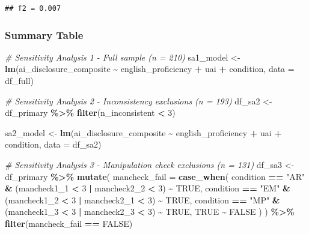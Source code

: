 \documentclass[
]{article}
\newenvironment{Shaded}{\begin{snugshade}}{\end{snugshade}}
\newcommand{\AttributeTok}[1]{\textcolor[rgb]{0.13,0.29,0.53}{#1}}
\newcommand{\CommentTok}[1]{\textcolor[rgb]{0.56,0.35,0.01}{\textit{#1}}}
\newcommand{\ConstantTok}[1]{\textcolor[rgb]{0.56,0.35,0.01}{#1}}
\newcommand{\DecValTok}[1]{\textcolor[rgb]{0.00,0.00,0.81}{#1}}
\newcommand{\FunctionTok}[1]{\textcolor[rgb]{0.13,0.29,0.53}{\textbf{#1}}}
\newcommand{\NormalTok}[1]{#1}
\newcommand{\OtherTok}[1]{\textcolor[rgb]{0.56,0.35,0.01}{#1}}
\newcommand{\SpecialCharTok}[1]{\textcolor[rgb]{0.81,0.36,0.00}{\textbf{#1}}}
\newcommand{\StringTok}[1]{\textcolor[rgb]{0.31,0.60,0.02}{#1}}
\begin{document}
\begin{verbatim}
## f2 = 0.007
\end{verbatim}

\subsubsection{Summary Table}\label{summary-table}

\begin{Shaded}
\begin{Highlighting}[]
\CommentTok{\# Sensitivity Analysis 1 {-} Full sample (n = 210)}
\NormalTok{sa1\_model }\OtherTok{\textless{}{-}} \FunctionTok{lm}\NormalTok{(ai\_disclosure\_composite }\SpecialCharTok{\textasciitilde{}}\NormalTok{ english\_proficiency }\SpecialCharTok{+}\NormalTok{ uai }\SpecialCharTok{+}\NormalTok{ condition,}
                \AttributeTok{data =}\NormalTok{ df\_full)}

\CommentTok{\# Sensitivity Analysis 2 {-} Inconsistency exclusions (n = 193)}
\NormalTok{df\_sa2 }\OtherTok{\textless{}{-}}\NormalTok{ df\_primary }\SpecialCharTok{\%\textgreater{}\%}
  \FunctionTok{filter}\NormalTok{(n\_inconsistent }\SpecialCharTok{\textless{}} \DecValTok{3}\NormalTok{)}

\NormalTok{sa2\_model }\OtherTok{\textless{}{-}} \FunctionTok{lm}\NormalTok{(ai\_disclosure\_composite }\SpecialCharTok{\textasciitilde{}}\NormalTok{ english\_proficiency }\SpecialCharTok{+}\NormalTok{ uai }\SpecialCharTok{+}\NormalTok{ condition,}
                \AttributeTok{data =}\NormalTok{ df\_sa2)}

\CommentTok{\# Sensitivity Analysis 3 {-} Manipulation check exclusions (n = 131)}
\NormalTok{df\_sa3 }\OtherTok{\textless{}{-}}\NormalTok{ df\_primary }\SpecialCharTok{\%\textgreater{}\%}
  \FunctionTok{mutate}\NormalTok{(}
    \AttributeTok{mancheck\_fail =} \FunctionTok{case\_when}\NormalTok{(}
\NormalTok{      condition }\SpecialCharTok{==} \StringTok{"AR"} \SpecialCharTok{\&}\NormalTok{ (mancheck1\_1 }\SpecialCharTok{\textless{}} \DecValTok{3} \SpecialCharTok{|}\NormalTok{ mancheck2\_2 }\SpecialCharTok{\textless{}} \DecValTok{3}\NormalTok{) }\SpecialCharTok{\textasciitilde{}} \ConstantTok{TRUE}\NormalTok{,}
\NormalTok{      condition }\SpecialCharTok{==} \StringTok{"EM"} \SpecialCharTok{\&}\NormalTok{ (mancheck1\_2 }\SpecialCharTok{\textless{}} \DecValTok{3} \SpecialCharTok{|}\NormalTok{ mancheck2\_1 }\SpecialCharTok{\textless{}} \DecValTok{3}\NormalTok{) }\SpecialCharTok{\textasciitilde{}} \ConstantTok{TRUE}\NormalTok{,}
\NormalTok{      condition }\SpecialCharTok{==} \StringTok{"MP"} \SpecialCharTok{\&}\NormalTok{ (mancheck1\_3 }\SpecialCharTok{\textless{}} \DecValTok{3} \SpecialCharTok{|}\NormalTok{ mancheck2\_3 }\SpecialCharTok{\textless{}} \DecValTok{3}\NormalTok{) }\SpecialCharTok{\textasciitilde{}} \ConstantTok{TRUE}\NormalTok{,}
      \ConstantTok{TRUE} \SpecialCharTok{\textasciitilde{}} \ConstantTok{FALSE}
\NormalTok{    )}
\NormalTok{  ) }\SpecialCharTok{\%\textgreater{}\%}
  \FunctionTok{filter}\NormalTok{(mancheck\_fail }\SpecialCharTok{==} \ConstantTok{FALSE}\NormalTok{)}


\end{Highlighting}
\end{Shaded}
\end{document}
